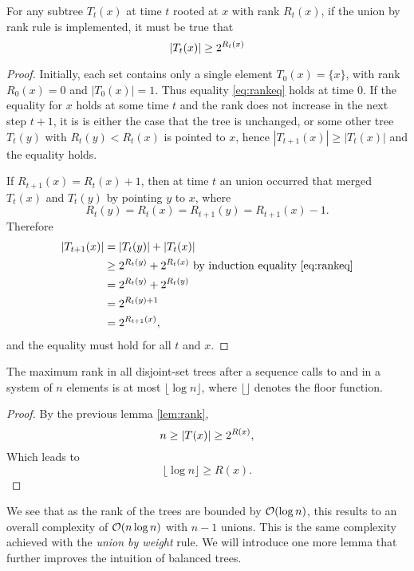 \begin{lemma}\label{lem:rank}
  For any subtree $T_t(x)$ at time $t$ rooted at $x$ with rank $R_t(x)$, if the union by rank rule is implemented, it must be true that 
  \begin{equation}\label{eq:rankeq}
    \abs{T_t(x)} \geq 2^{R_t(x)}
  \end{equation}
\end{lemma}
\begin{proof}
  Initially, each set contains only a single element $T_0(x) = \{x\}$, with rank $R_0(x)=0$ and $|T_0(x)|=1$. Thus equality \eqref{eq:rankeq} holds at time $0$. If the equality for $x$ holds at some time $t$ and the rank does not increase in the next step $t+1$, it is is either the case that the tree is unchanged, or some other tree $T_t(y)$ with $R_t(y)<R_t(x)$ is pointed to $x$, hence $|T_{t+1}(x)| \geq  |T_t(x)|$ and the equality holds. 
  
  If $R_{t+1}(x) = R_t(x) + 1$, then at time $t$ an union occurred that merged $T_t(x)$ and $T_t(y)$ by pointing $y$ to $x$, where
  \begin{equation*}
    R_t(y) = R_t(x) = R_{t+1}(y) = R_{t+1}(x) - 1.
  \end{equation*}
  Therefore
  \begin{align*}
    \abs{T_{t+1}(x)} &= \abs{T_t(y)} + \abs{T_t(x)} \\
      &\geq 2^{R_t(y)} + 2^{R_t(x)} \text{ by induction equality \eqref{eq:rankeq}} \\
      &= 2^{R_t(y)} + 2^{R_t(y)} \\
      &= 2^{R_t(y)+1} \\
      &= 2^{R_{t+1}(x)},
  \end{align*}
  and the equality must hold for all $t$ and $x$. 
\end{proof}
\begin{lemma}\label{lem:maxrank}
    The maximum rank in all disjoint-set trees after a sequence calls to  and  in a system of $n$ elements is at most $\lfloor \log n \rfloor$, where $\lfloor \rfloor$ denotes the floor function. 
\end{lemma}
\begin{proof}
    By the previous lemma \ref{lem:rank}, 
    \begin{equation*}
        n \geq \abs{T(x)} \geq 2^{R(x)}, 
    \end{equation*}
    Which leads to 
    \begin{equation*}
        \lfloor \log n \rfloor \geq R(x).
    \end{equation*}
\end{proof}
We see that as the rank of the trees are bounded by $\mathcal{O}(\log n)$, this results to an overall complexity of $\mathcal{O}(n\log n)$ with $n-1$ unions. This is the same complexity achieved with the \emph{union by weight} rule. We will introduce one more lemma that further improves the intuition of balanced trees. 

